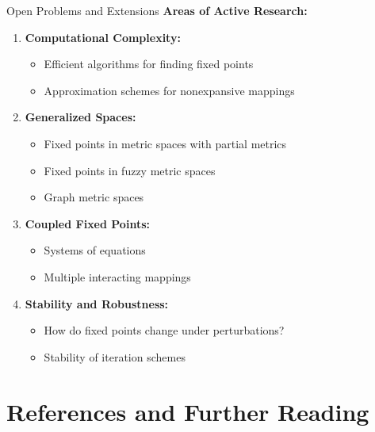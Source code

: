 \documentclass[aspectratio=169,10pt]{beamer}
\begin{document}
\begin{frame}{Open Problems and Extensions}
    \textbf{Areas of Active Research:}
    \begin{enumerate}
        \item \textbf{Computational Complexity:}
            \begin{itemize}
                \item Efficient algorithms for finding fixed points
                \item Approximation schemes for nonexpansive mappings
            \end{itemize}

        \item \textbf{Generalized Spaces:}
            \begin{itemize}
                \item Fixed points in metric spaces with partial metrics
                \item Fixed points in fuzzy metric spaces
                \item Graph metric spaces
            \end{itemize}

        \item \textbf{Coupled Fixed Points:}
            \begin{itemize}
                \item Systems of equations
                \item Multiple interacting mappings
            \end{itemize}

        \item \textbf{Stability and Robustness:}
            \begin{itemize}
                \item How do fixed points change under perturbations?
                \item Stability of iteration schemes
            \end{itemize}
    \end{enumerate}
\end{frame}

\section{References and Further Reading}
\end{document}
